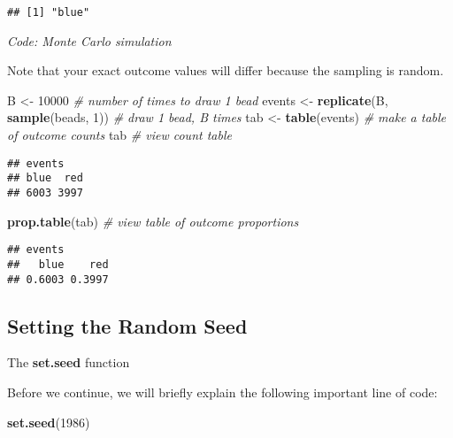 \documentclass[
]{article}
\newenvironment{Shaded}{\begin{snugshade}}{\end{snugshade}}
\newcommand{\CommentTok}[1]{\textcolor[rgb]{0.56,0.35,0.01}{\textit{#1}}}
\newcommand{\DecValTok}[1]{\textcolor[rgb]{0.00,0.00,0.81}{#1}}
\newcommand{\KeywordTok}[1]{\textcolor[rgb]{0.13,0.29,0.53}{\textbf{#1}}}
\newcommand{\NormalTok}[1]{#1}
\newcommand{\StringTok}[1]{\textcolor[rgb]{0.31,0.60,0.02}{#1}}
\begin{document}
\begin{verbatim}
## [1] "blue"
\end{verbatim}

\emph{Code: Monte Carlo simulation}

Note that your exact outcome values will differ because the sampling is
random.

\begin{Shaded}
\begin{Highlighting}[]
\NormalTok{B \textless{}{-}}\StringTok{ }\DecValTok{10000}    \CommentTok{\# number of times to draw 1 bead}
\NormalTok{events \textless{}{-}}\StringTok{ }\KeywordTok{replicate}\NormalTok{(B, }\KeywordTok{sample}\NormalTok{(beads, }\DecValTok{1}\NormalTok{))    }\CommentTok{\# draw 1 bead, B times}
\NormalTok{tab \textless{}{-}}\StringTok{ }\KeywordTok{table}\NormalTok{(events)    }\CommentTok{\# make a table of outcome counts}
\NormalTok{tab    }\CommentTok{\# view count table}
\end{Highlighting}
\end{Shaded}

\begin{verbatim}
## events
## blue  red 
## 6003 3997
\end{verbatim}

\begin{Shaded}
\begin{Highlighting}[]
\KeywordTok{prop.table}\NormalTok{(tab)    }\CommentTok{\# view table of outcome proportions}
\end{Highlighting}
\end{Shaded}

\begin{verbatim}
## events
##   blue    red 
## 0.6003 0.3997
\end{verbatim}

\hypertarget{setting-the-random-seed}{%
\subsection{Setting the Random Seed}\label{setting-the-random-seed}}

The \textbf{set.seed} function

Before we continue, we will briefly explain the following important line
of code:

\begin{Shaded}
\begin{Highlighting}[]
\KeywordTok{set.seed}\NormalTok{(}\DecValTok{1986}\NormalTok{)}
\end{Highlighting}
\end{Shaded}
\end{document}
